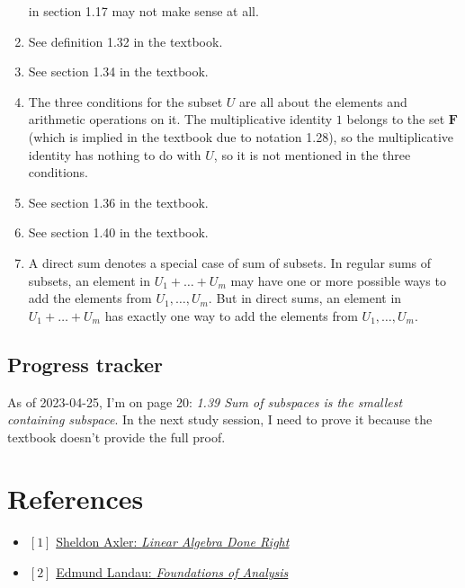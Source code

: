 \documentclass[12pt, letterpaper, oneside]{book}
\begin{document}
\begin{enumerate}
    in section 1.17 may not make sense at all.
  \item See definition 1.32 in the textbook.
  \item See section 1.34 in the textbook.
  \item The three conditions for the subset $U$ are all about the elements and
    arithmetic operations on it. The multiplicative identity $1$ belongs to the
    set $\mathbf{F}$ (which is implied in the textbook due to notation 1.28),
    so the multiplicative identity has nothing to do with $U$, so it is not
    mentioned in the three conditions.
  \item See section 1.36 in the textbook.
  \item See section 1.40 in the textbook.
  \item A direct sum denotes a special case of sum of subsets. In regular sums
    of subsets, an element in $U_1 + \ldots + U_m$ may have one or more
    possible ways to add the elements from $U_1, \ldots, U_m$. But in direct
    sums, an element in $U_1 + \ldots + U_m$ has exactly one way to add the
    elements from $U_1, \ldots, U_m$.
\end{enumerate}

\section{Progress tracker}

As of 2023-04-25, I'm on page 20: \textit{1.39 Sum of subspaces is the smallest
containing subspace}. In the next study session, I need to prove it because the
textbook doesn't provide the full proof.

\chapter*{References}

\begin{itemize}
  \item $[1]$ \href{https://linear.axler.net/}{Sheldon Axler: \it{Linear Algebra Done Right}}
  \item $[2]$ \href{https://bookstore.ams.org/view?ProductCode=CHEL/79}{Edmund Landau: \it{Foundations of Analysis}}
\end{itemize}
\end{document}
